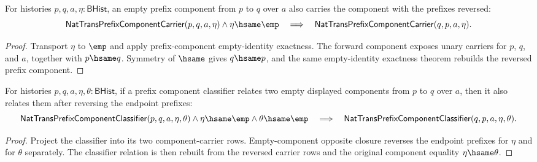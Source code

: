 \begin{theorem}
\label{thm:nattrans-prefix-component-empty-component-opposite-closed}
For histories $p,q,a,\eta:\mathsf{BHist}$, an empty prefix component from $p$
to $q$ over $a$ also carries the component with the prefixes reversed:
$$
\mathsf{NatTransPrefixComponentCarrier}(p,q,a,\eta)\land
\eta\hsame\emp
\quad\Longrightarrow\quad
\mathsf{NatTransPrefixComponentCarrier}(q,p,a,\eta).
$$
\end{theorem}
\begin{proof}
Transport $\eta$ to $\emp$ and apply prefix-component empty-identity
exactness. The forward component exposes unary carriers for $p$, $q$, and $a$,
together with $p\hsame q$. Symmetry of $\hsame$ gives $q\hsame p$, and the
same empty-identity exactness theorem rebuilds the reversed prefix component.
\end{proof}

\begin{theorem}
\label{thm:nattrans-prefix-component-classifier-empty-component-opposite-closed}
For histories $p,q,a,\eta,\theta:\mathsf{BHist}$, if a prefix component
classifier relates two empty displayed components from $p$ to $q$ over $a$,
then it also relates them after reversing the endpoint prefixes:
$$
\mathsf{NatTransPrefixComponentClassifier}(p,q,a,\eta,\theta)\land
\eta\hsame\emp\land\theta\hsame\emp
\quad\Longrightarrow\quad
\mathsf{NatTransPrefixComponentClassifier}(q,p,a,\eta,\theta).
$$
\end{theorem}
\begin{proof}
Project the classifier into its two component-carrier rows. Empty-component
opposite closure reverses the endpoint prefixes for $\eta$ and for $\theta$
separately. The classifier relation is then rebuilt from the reversed carrier
rows and the original component equality $\eta\hsame\theta$.
\end{proof}

